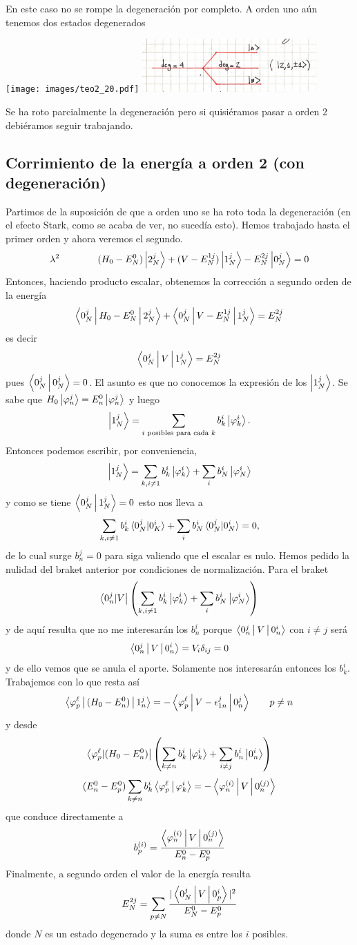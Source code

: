 \documentclass[10pt,oneside]{CBFT_book}
\begin{document}
En este caso no se rompe la degeneración por completo.
A orden uno aún tenemos dos estados degenerados

	\texttt{[image: images/teo2\_20.pdf]}
	\includegraphics[width=0.5\textwidth]{images/fig_ft2_degeneracion_3.jpg}

Se ha roto parcialmente la degeneración pero si quisiéramos pasar a orden 2 debiéramos
seguir trabajando.

\subsection{Corrimiento de la energía a orden 2 (con degeneración)}

Partimos de la suposición de que a orden uno se ha roto toda la degeneración (en el efecto
Stark, como se acaba de ver, no sucedía esto). Hemos trabajado hasta el primer orden y
ahora veremos el segundo.
\[
	\lambda^2 \qquad \qquad (H_0 - E_N^0) \Ket{2_N^j} + (V - E_N^{1 j}) 
	\Ket{1_N^j} - E_N^{2 j} \Ket{0_N^j} = 0
\]
Entonces, haciendo producto escalar, obtenemos la corrección a segundo orden de la energía 
\[
	\Braket{0_N^j | H_0 - E_N^0 | 2_N^j} + \Braket{ 0_N^j | V - E_N^{1 j} | 1_N^j} = E_N^{2 j}
\]
es decir
\[
	\Braket{ 0_N^j | V | 1_N^j} = E_N^{2 j}
\]
pues $\Braket{0_N^j|0_N^j}= 0$.
El asunto es que no conocemos la expresión de los $\Ket{1_N^j}$. Se sabe que $ H_0 \Ket{\varphi_n^j} = 
E_n^0 \Ket{\varphi_n^j}$ y luego 
\[
	\Ket{1_N^j} = \sum_{ i \text{ posibles para cada } k } b_k^i \Ket{\varphi_k^i}.
\]
Entonces podemos escribir, por conveniencia,
\[
	\Ket{1_N^j} = \sum_{k,i\neq 1} b_k^i \Ket{\varphi_k^i} + \sum_i b_N^i \Ket{\varphi_N^i}
\]
y como se tiene $\Braket{0_N^j|1_N^j} = 0$ esto nos lleva a 
\[
	\sum_{k,i\neq 1} b_k^i \braket{0_N^j|0_K^i} + 
		\sum_i b_N^i \braket{0_N^j|0_N^i} = 0,
\]
de lo cual surge $ b_n^j = 0 $ para siga valiendo que el escalar es nulo. Hemos pedido la nulidad
del braket anterior por condiciones de normalización.
Para el braket 
\[
	\Bra{0_n^j | V } \left( \sum_{k,i\neq 1} b_k^i \Ket{\varphi_k^i} + 
	\sum_i b_N^i \Ket{\varphi_N^i} \right)
\]
y de aquí resulta que no me interesarán los $b_n^i$ porque $ \Braket{0_n^j|V|0_n^i} $ con $ i \neq j $ será
\[
	\Braket{0_n^j|V|0_n^i} = V_i \delta_{ij} = 0 
\]
y de ello vemos que se anula el aporte. Solamente nos interesarán entonces los $b_k^i$.
Trabajemos con lo que resta así
\[
	\Braket{\varphi_p^\ell | (H_0 - E_n^0) | 1_n^j } = 
	- \Braket{ \varphi_p^\ell | V - \epsilon_{1n}^j | 0_n^j  } \qquad p \neq n
\]
y desde
\[
	\Bra{ \varphi_p^\ell | (H_0 - E_n^0) } \left( \sum_{k \neq n} b_k^i \Ket{\varphi_k^i} + 
	\sum_{i \neq j} b_n^i \Ket{ 0_n^i} \right)
\]
\[
	( E_n^0 - E_p^0 ) \sum_{k \neq n} b_k^i \Braket{\varphi_p^\ell | \varphi_k^i } =
	- \Braket{\varphi_n^{(i)} | V | 0_n^{(j)} } 
\]
que conduce directamente a 
\[
	b_p^{(i)} = \frac{\Braket{ \varphi_n^{(i)} | V | 0_n^{(j)} } }{E_n^0 - E_p^0}
\]
Finalmente, a segundo orden el valor de la energía resulta
\[
	E_N^{2j} = \sum_{p\neq N} \frac{|\Braket{0_N^j|V|0_p^i}|^2}{E_N^0 - E_p^0}
\]
donde $N$ es un estado degenerado y la suma es entre los $i$ posibles.
\end{document}
